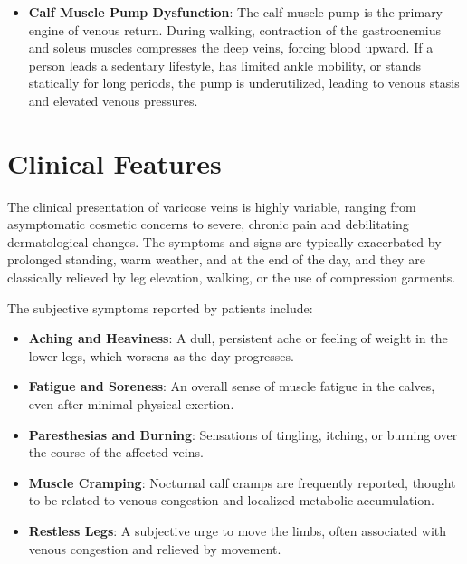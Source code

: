 \begin{itemize}
\item \textbf{Calf Muscle Pump Dysfunction}: The calf muscle pump is the primary engine of venous return. During walking, contraction of the gastrocnemius and soleus muscles compresses the deep veins, forcing blood upward. If a person leads a sedentary lifestyle, has limited ankle mobility, or stands statically for long periods, the pump is underutilized, leading to venous stasis and elevated venous pressures.
\end{itemize}

\section*{Clinical Features}
The clinical presentation of varicose veins is highly variable, ranging from asymptomatic cosmetic concerns to severe, chronic pain and debilitating dermatological changes. The symptoms and signs are typically exacerbated by prolonged standing, warm weather, and at the end of the day, and they are classically relieved by leg elevation, walking, or the use of compression garments.

The subjective symptoms reported by patients include:
\begin{itemize}
\item \textbf{Aching and Heaviness}: A dull, persistent ache or feeling of weight in the lower legs, which worsens as the day progresses.
\item \textbf{Fatigue and Soreness}: An overall sense of muscle fatigue in the calves, even after minimal physical exertion.
\item \textbf{Paresthesias and Burning}: Sensations of tingling, itching, or burning over the course of the affected veins.
\item \textbf{Muscle Cramping}: Nocturnal calf cramps are frequently reported, thought to be related to venous congestion and localized metabolic accumulation.
\item \textbf{Restless Legs}: A subjective urge to move the limbs, often associated with venous congestion and relieved by movement.
\end{itemize}

